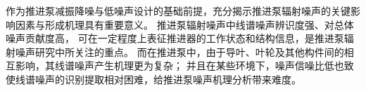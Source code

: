 \cleardoublepage
{}
\begin{comment}
目前船艇推进系统对高效低噪声推进泵的需求日益迫切，
在满足推进性能需求的基础上，
推进泵水下噪声已经成为一项关键技术指标。
为了更好的服务于推进泵低噪声设计，
有必要对推进泵噪声的声纹特征进行研究。
噪声的特征线谱是推进泵噪声研究中所关注的重点，
特征线谱不仅能表征推进泵的工作状态和结构信息，
也是声呐系统追踪和识别的重要信息，
但是其提取面临环境干扰强、直接测量难度大的问题。
因此，本文围绕推进泵噪声的声纹特征展开，针对噪声特征线谱提取的需求，
以紧凑型前置导叶的单级推进泵和新型结构的双级推进泵为研究对象，
设计噪声测试与分析系统并开展试验研究，
研究了推进泵噪声的声纹特征，
基于循环平稳分析方法实现了推进泵噪声的特征线谱提取。
本文主要研究内容包括以下几个方面：

（1）基于LabVIEW开发了推进泵噪声测试与分析系统。
其中涵盖了传感器、数据采集等硬件设计，以及信号分析、显示、存储等软件模块的设计。
该系统支持同步对多通道传感器信号实时采集，各通道信号同时分析、显示及存储，
具有操作简单、经济高效等优势。
基于系统的信号分析模块，可实现对噪声的频段能量分布特点、特征频段总声压量级、频谱特征等声纹特征分析。

（2）以紧凑型前置导叶的单级推进泵和新型结构的双级推进泵为研究对象，
在大型空泡水洞中对其分别开展了噪声试验。
在考虑背景噪声影响的基础上，
研究不同工况下推进泵噪声的声纹特征变化，
以及流速等与噪声的声学关联性。
结果表明，中低频段噪声对推进泵噪声有显著贡献。
噪声中低频段、高频段和全频段的总声压级随着流速的增大而增大，
流速变化对推进泵噪声能量分布和总声压级影响主要体现在中低频段。
两种形式的推进泵噪声频谱均表现为中低频线谱噪声、中低频宽带噪声和高频宽带噪声。

（3）开展了推进泵噪声信号的特性研究。
结合推进泵噪声信号产生的机理和噪声信号特征，对噪声信号进行了
组分分析。推进泵噪声信号成分主要包括确定性信号分量、调制信号分量和环境噪声信号分量。
基于推进泵噪声信号的循环平稳特性和各组分的特点，
对匀速运转工况下的无空化噪声信号建立了幅值调制信号模型，
采用循环平稳分析方法对噪声信号的仿真模型进行了研究，
验证了循环平稳解调算法提取多组分调制频率的有效性和良好的抗噪性能。
 
（4）推进泵噪声的特征线谱提取和分析。针对噪声特征线谱提取的需求，
基于循环平稳分析方法实现了推进泵低频线谱的提取。
为了验证循环平稳分析方法提取特征线谱的可行性，采用 CFD 数
值模拟获得了推进泵脉动力特征，
结果表明循环平稳分析方法提取出的低频线谱成分可以和非定常脉动力的特征线谱对应起来。
同时，对推进泵噪声的调制特性进行了研究，
发现推进泵噪声信号具有强烈的调制特征，其中轴频和动叶叶频为主要的调制频率。
随着流速的增大，动叶叶频的调制贡献度也愈发显著。

\end{comment}
作为推进泵减振降噪与低噪声设计的基础前提，充分揭示推进泵辐射噪声的关键影响因素与形成机理具有重要意义。
推进泵辐射噪声中线谱噪声辨识度强、对总体噪声贡献度高，
可在一定程度上表征推进器的工作状态和结构信息，是推进泵辐射噪声研究中所关注的重点。
而在推进泵中，由于导叶、叶轮及其他构件间的相互影响，其线谱噪声产生机理更为复杂；
并且在某些环境下，噪声信噪比低也致使线谱噪声的识别提取相对困难，给推进泵噪声机理分析带来难度。

